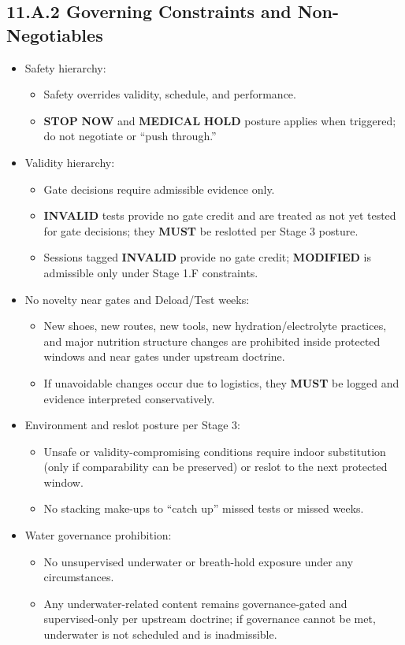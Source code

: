 \documentclass[10pt]{article}
\begin{document}
\newpage

\subsection*{11.A.2 Governing Constraints and Non-Negotiables}
{}

\begin{itemize}
\item Safety hierarchy:
  \begin{itemize}
  \item Safety overrides validity, schedule, and performance.
  \item \textbf{STOP} \textbf{NOW} and \textbf{MEDICAL} \textbf{HOLD} posture applies when triggered; do not negotiate or “push through.”
  \end{itemize}
\item Validity hierarchy:
  \begin{itemize}
  \item Gate decisions require admissible evidence only.
  \item \textbf{INVALID} tests provide no gate credit and are treated as not yet tested for gate decisions; they \textbf{MUST} be reslotted per Stage 3 posture.
  \item Sessions tagged \textbf{INVALID} provide no gate credit; \textbf{MODIFIED} is admissible only under Stage 1.F constraints.
  \end{itemize}
\item No novelty near gates and Deload/Test weeks:
  \begin{itemize}
  \item New shoes, new routes, new tools, new hydration/electrolyte practices, and major nutrition structure changes are prohibited inside protected windows and near gates under upstream doctrine.
  \item If unavoidable changes occur due to logistics, they \textbf{MUST} be logged and evidence interpreted conservatively.
  \end{itemize}
\item Environment and reslot posture per Stage 3:
  \begin{itemize}
  \item Unsafe or validity-compromising conditions require indoor substitution (only if comparability can be preserved) or reslot to the next protected window.
  \item No stacking make-ups to “catch up” missed tests or missed weeks.
  \end{itemize}
\item Water governance prohibition:
  \begin{itemize}
  \item No unsupervised underwater or breath-hold exposure under any circumstances.
  \item Any underwater-related content remains governance-gated and supervised-only per upstream doctrine; if governance cannot be met, underwater is not scheduled and is inadmissible.
  \end{itemize}
\end{itemize}
\end{document}
